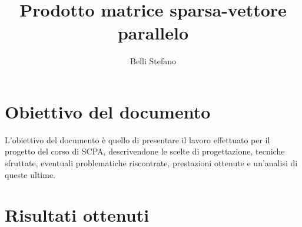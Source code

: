 \documentclass[10pt]{article}
\title{Prodotto matrice sparsa-vettore parallelo}
\author{Belli Stefano}
\date{}
\begin{document}
\maketitle
\thispagestyle{empty}
\newpage

\pagestyle{empty}
\tableofcontents
\newpage

\section*{Obiettivo del documento}
L'obiettivo del documento è quello di presentare il lavoro effettuato per il progetto del
corso di SCPA, descrivendone le scelte di progettazione, tecniche sfruttate, 
eventuali problematiche riscontrate, prestazioni ottenute e un'analisi di queste ultime.

\newpage

\pagestyle{plain}
	
\section{Risultati ottenuti}
\end{document}
